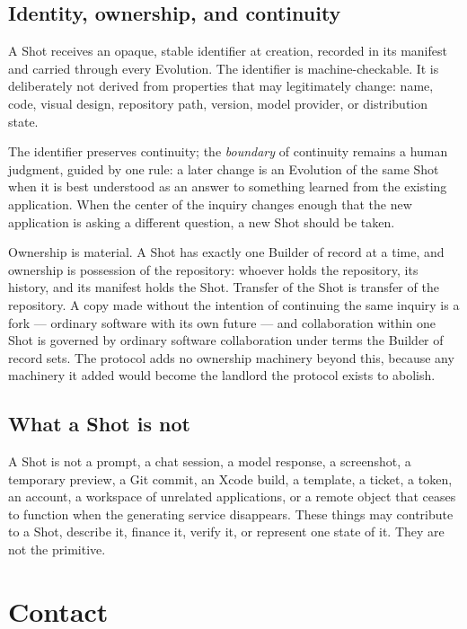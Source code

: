 \documentclass[11pt]{article}
\begin{document}
\subsection{Identity, ownership, and continuity}

A Shot receives an opaque, stable identifier at creation, recorded in
its manifest and carried through every Evolution. The identifier is
machine-checkable. It is deliberately not derived from properties that
may legitimately change: name, code, visual design, repository path,
version, model provider, or distribution state.

The identifier preserves continuity; the \emph{boundary} of continuity
remains a human judgment, guided by one rule: a later change is an
Evolution of the same Shot when it is best understood as an answer to
something learned from the existing application. When the center of the
inquiry changes enough that the new application is asking a different
question, a new Shot should be taken.

Ownership is material. A Shot has exactly one Builder of record at a
time, and ownership is possession of the repository: whoever holds the
repository, its history, and its manifest holds the Shot. Transfer of
the Shot is transfer of the repository. A copy made without the
intention of continuing the same inquiry is a fork --- ordinary software
with its own future --- and collaboration within one Shot is governed by
ordinary software collaboration under terms the Builder of record sets.
The protocol adds no ownership machinery beyond this, because any
machinery it added would become the landlord the protocol exists to
abolish.

\subsection{What a Shot is not}

A Shot is not a prompt, a chat session, a model response, a screenshot,
a temporary preview, a Git commit, an Xcode build, a template, a ticket,
a token, an account, a workspace of unrelated applications, or a remote
object that ceases to function when the generating service disappears.
These things may contribute to a Shot, describe it, finance it, verify
it, or represent one state of it. They are not the primitive.

\section{Contact}
\end{document}
